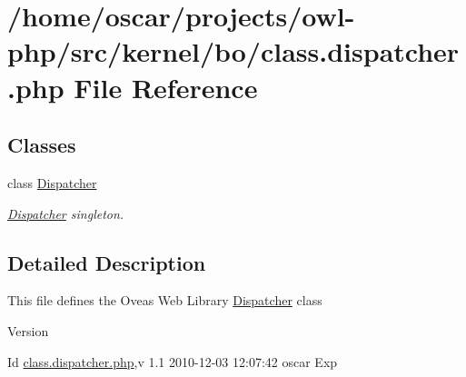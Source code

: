 \section{/home/oscar/projects/owl-\/php/src/kernel/bo/class.dispatcher.php File Reference}
\label{class_8dispatcher_8php}
\subsection*{Classes}
\begin{DoxyCompactItemize}
\item 
class \hyperlink{classDispatcher}{Dispatcher}
\begin{DoxyCompactList}\small\item\em \hyperlink{classDispatcher}{Dispatcher} singleton. \item\end{DoxyCompactList}\end{DoxyCompactItemize}


\subsection{Detailed Description}
This file defines the Oveas Web Library \hyperlink{classDispatcher}{Dispatcher} class \begin{DoxyVersion}{Version}

\end{DoxyVersion}
\begin{DoxyParagraph}{Id}
\hyperlink{class_8dispatcher_8php}{class.dispatcher.php},v 1.1 2010-\/12-\/03 12:07:42 oscar Exp 
\end{DoxyParagraph}
